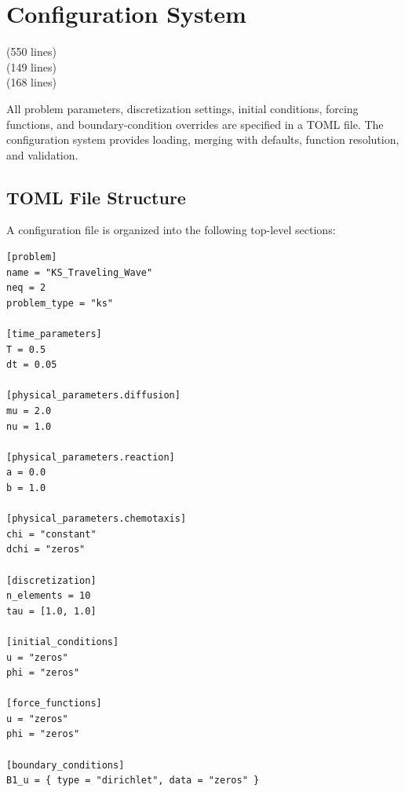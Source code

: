 \section{Configuration System}
\label{sec:config}

\begin{center}
 \quad(550 lines) \\
 \quad(149 lines) \\
 \quad(168 lines)
\end{center}

All problem parameters, discretization settings, initial conditions,
forcing functions, and boundary-condition overrides are specified in a
TOML file.  The configuration system provides loading, merging with
defaults, function resolution, and validation.

\subsection{TOML File Structure}

A configuration file is organized into the following top-level sections:

\begin{lstlisting}[caption={Typical TOML layout (Keller-Segel example)}]
[problem]
name = "KS_Traveling_Wave"
neq = 2
problem_type = "ks"

[time_parameters]
T = 0.5
dt = 0.05

[physical_parameters.diffusion]
mu = 2.0
nu = 1.0

[physical_parameters.reaction]
a = 0.0
b = 1.0

[physical_parameters.chemotaxis]
chi = "constant"
dchi = "zeros"

[discretization]
n_elements = 10
tau = [1.0, 1.0]

[initial_conditions]
u = "zeros"
phi = "zeros"

[force_functions]
u = "zeros"
phi = "zeros"

[boundary_conditions]
B1_u = { type = "dirichlet", data = "zeros" }
\end{lstlisting}

